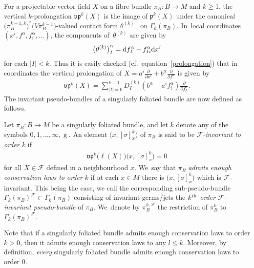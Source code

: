 \documentclass[10pt,a4paper]{amsart}
\numberwithin{equation}{section}
\def\g{\operatorname{g}}
\def\FF{{\mathcal{F}}}
\def\pf{{\mathfrak{p}}}
\def\vpf{{\mathfrak{vp}}}
\begin{document}
For a projectable vector field $X$ on a fibre bundle $\pi_{B}\colon B\rightarrow M$ and $k\geq1$, the vertical $k$-prolongation $\vpf^{k}(X)$ is the image of $\pf^{k}(X)$ under the canonical $\big(\pi_{B}^{k-1,k}\big)^{*}\big(V\pi_{B}^{k-1}\big)$-valued contact form $\theta^{(k)}$~\cite[Chapter~6.3]{saunders} on $\Gamma_{k}(\pi_{B})$. In~local coordinates $(x^{i},f^{\alpha},f^{\alpha}_{i},\dots)$, the components of~$\theta^{(k)}$ are given by
\begin{gather*}
\big(\theta^{(k)}\big)^{\alpha}_{I} = {\rm d}f^{\alpha}_{I} - f^{\alpha}_{Ii}{\rm d}x^{i}
\end{gather*}
for each $|I|<k$. Thus it is easily checked (cf.~equation~\eqref{prolongation}) that in coordinates the vertical prolongation of $X = a^{i}\frac{\partial}{\partial x^{i}}+b^{\alpha}\frac{\partial}{\partial f^{\alpha}}$ is given by
\begin{gather*}
\vpf^{k}(X) = \sum_{|I|=0}^{k-1}D_{I}^{(k)}(b^{\alpha}-a^{i}f^{\alpha}_{i})\frac{\partial}{\partial f^{\alpha}_{I}}.
\end{gather*}
The invariant pseudo-bundles of a singularly foliated bundle are now defined as follows.

\begin{Definition}\label{FFinv}
Let $\pi_{B}\colon B\rightarrow M$ be a singularly foliated bundle, and let $k$ denote any of the symbols $0,1,\dots,\infty,\g$. An element $\big(x,[\sigma]^{k}_{x}\big)$ of $\pi_{B}$ is said to be \textit{$\FF$-invariant to order $k$} if
\begin{gather*}
\vpf^{k}\big(\ell(X)\big)\big(x,[\sigma]^{k}_{x}\big) = 0
\end{gather*}
for all $X\in\FF$ defined in a neighbourhood $x$. We~say that $\pi_{B}$ \textit{admits enough conservation laws to order $k$} if at each $x\in M$ there is $\big(x,[\sigma]^{k}_{x}\big)$ which is $\FF$-invariant. This being the case, we call the corresponding sub-pseudo-bundle $\Gamma_{k}(\pi_{B})^{\FF}\subset\Gamma_{k}(\pi_{B})$ consisting of invariant germs/jets the \textit{$k^{\rm th}$ order $\FF$-invariant pseudo-bundle} of $\pi_{B}$. We~denote by $\pi_{B}^{k,\FF}$ the restriction of $\pi_{B}^{k}$ to $\Gamma_{k}(\pi_{B})^{\FF}$.
\end{Definition}

Note that if a singularly foliated bundle admits enough conservation laws to order $k>0$, then it admits enough conservation laws to any $l\leq k$. Moreover, by definition, \textit{every} singularly foliated bundle admits enough conservation laws to order 0.
\end{document}
